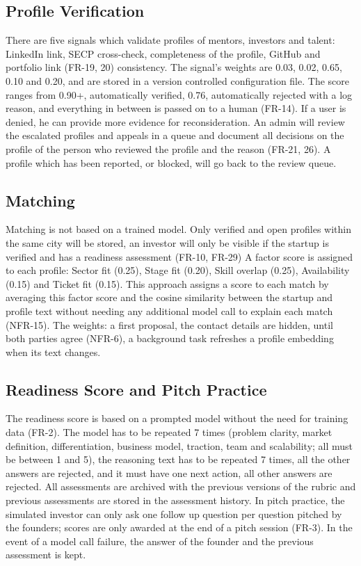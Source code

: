 \documentclass{FastFyp}
\begin{document}
\subsection{Profile Verification}
There are five signals which validate profiles of mentors, investors and talent: LinkedIn link, SECP cross-check, completeness of the profile, GitHub and portfolio link (FR-19, 20) consistency. The signal's weights are 0.03, 0.02, 0.65, 0.10 and 0.20, and are stored in a version controlled configuration file. The score ranges from 0.90+, automatically verified, 0.76, automatically rejected with a log reason, and everything in between is passed on to a human (FR-14). If a user is denied, he can provide more evidence for reconsideration. An admin will review the escalated profiles and appeals in a queue and document all decisions on the profile of the person who reviewed the profile and the reason (FR-21, 26). A profile which has been reported, or blocked, will go back to the review queue.

\subsection{Matching}
Matching is not based on a trained model. Only verified and open profiles within the same city will be stored, an investor will only be visible if the startup is verified and has a readiness assessment (FR-10, FR-29) A factor score is assigned to each profile: Sector fit (0.25), Stage fit (0.20), Skill overlap (0.25), Availability (0.15) and Ticket fit (0.15). This approach assigns a score to each match by averaging this factor score and the cosine similarity between the startup and profile text without needing any additional model call to explain each match (NFR-15). The weights: a first proposal, the contact details are hidden, until both parties agree (NFR-6), a background task refreshes a profile embedding when its text changes.

\subsection{Readiness Score and Pitch Practice}
The readiness score is based on a prompted model without the need for training data (FR-2). The model has to be repeated 7 times (problem clarity, market definition, differentiation, business model, traction, team and scalability; all must be between 1 and 5), the reasoning text has to be repeated 7 times, all the other answers are rejected, and it must have one next action, all other answers are rejected. All assessments are archived with the previous versions of the rubric and previous assessments are stored in the assessment history. In pitch practice, the simulated investor can only ask one follow up question per question pitched by the founders; scores are only awarded at the end of a pitch session (FR-3). In the event of a model call failure, the answer of the founder and the previous assessment is kept.
\end{document}
